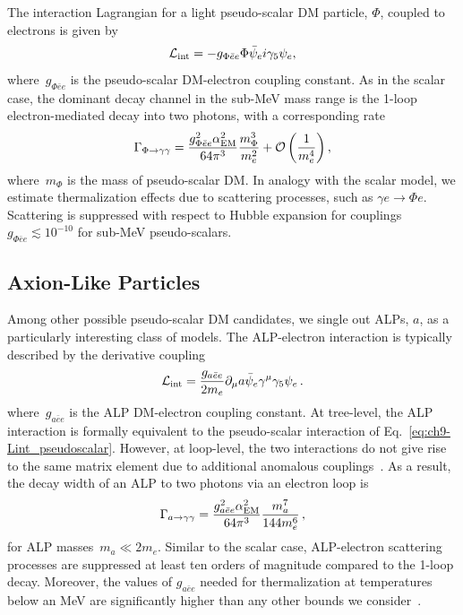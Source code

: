 The interaction Lagrangian for a light pseudo-scalar DM particle, $\Phi$, coupled to electrons is given by
\begin{equation}
  \mathcal{L}_{\rm{int}} = -g_{\Phi \bar e e} \Phi \bar\psi_e i \gamma_5 \psi_e,
  \label{eq:ch9-Lint_pseudoscalar}
\end{equation}
where~$g_{\Phi \bar{e} e}$ is the pseudo-scalar DM-electron coupling constant.
As in the scalar case, the dominant decay channel in the sub-MeV mass range is the 1-loop electron-mediated decay into two photons, with a corresponding rate
\begin{equation}
  \Gamma_{\Phi \rightarrow \gamma \gamma} = \frac{g_{\Phi \bar e e}^2 \alpha_{\rm{EM}}^2}{64 \pi^3} \frac{m_\Phi^3}{m_e^2} + \mathcal{O}\left(\frac{1}{m_e^4}\right),
  \label{eq:ch9-Gamma_pseudoscalar}
\end{equation}
where~$m_\Phi$ is the mass of pseudo-scalar DM.
In analogy with the scalar model, we estimate thermalization effects due to scattering processes, such as $\gamma e \rightarrow \Phi e$.
Scattering is suppressed with respect to Hubble expansion for couplings $g_{\Phi\bar{e}e} \lesssim 10^{-10}$ for sub-MeV pseudo-scalars.


\subsection{Axion-Like Particles}

Among other possible pseudo-scalar DM candidates, we single out ALPs, $a$, as a particularly interesting class of models.
The ALP-electron interaction is typically described by the derivative coupling
\begin{equation}
  \mathcal{L}_{\rm{int}} = \frac{g_{a \bar e e}}{2 m_e} \partial_\mu a \bar{\psi}_e \gamma^\mu \gamma_5 \psi_e \,.
  \label{eq:ch9-Lint_ALP}
\end{equation}
where~$g_{a \bar{e} e}$ is the ALP DM-electron coupling constant.
At tree-level, the ALP interaction is formally equivalent to the pseudo-scalar interaction of Eq.~\eqref{eq:ch9-Lint_pseudoscalar}.
However, at loop-level, the two interactions do not give rise to the same matrix element due to additional anomalous couplings~\cite{Quevillon:2019zrd, Ferreira:2022xlw}.
As a result, the decay width of an ALP to two photons via an electron loop is~\cite{Ferreira:2022xlw}
\begin{equation}
  \Gamma_{a\rightarrow \gamma \gamma} =\frac{g_{a \bar e e}^2\alpha_{\rm{EM}}^2}{64 \pi^3} \frac{  m_a^7}{ 144 m_e^6 } \,,
  \label{eq:ch9-Gamma_alp}
\end{equation}
for ALP masses~$m_a \ll 2 m_e$.
Similar to the scalar case, ALP-electron scattering processes are suppressed at least ten orders of magnitude compared to the 1-loop decay.
Moreover, the values of $g_{a \bar e e}$ needed for thermalization at temperatures below an MeV are significantly higher than any other bounds we consider~\cite{Green:2021hjh}.

